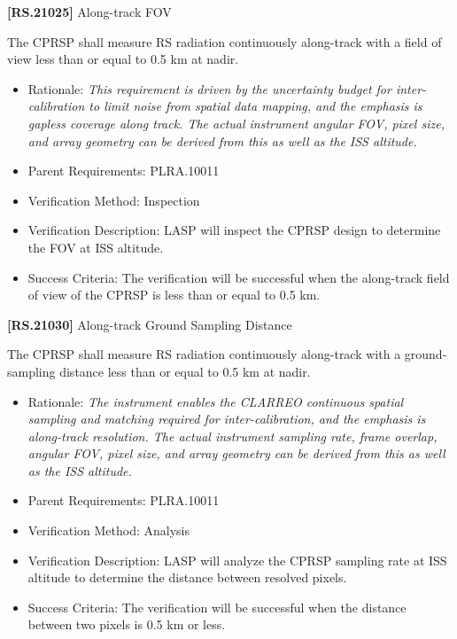 \documentclass[12pt,oneside,oldfontcommands]{memoir}
\begin{document}
\textbf{[RS.21025]} Along-track \gls{FOV}

The \gls{CPRSP} shall \gls{measure} \gls{RS} radiation continuously along-track with a field of view less than or equal to 0.5 km at nadir.

\begin{itemize}
\item{} Rationale: \emph{This requirement is driven by the uncertainty budget for inter-calibration to limit noise from spatial data mapping, and the emphasis is gapless coverage along track. The actual instrument angular FOV, pixel size, and array geometry can be derived from this as well as the ISS altitude.}

\item{} Parent Requirements: PLRA.10011

\item{} Verification Method: Inspection

\item{} Verification Description: \gls{LASP} will inspect the \gls{CPRSP} design to determine the \gls{FOV} at \gls{ISS} altitude.

\item{} Success Criteria: The verification will be successful when the along-track field of view of the \gls{CPRSP} is less than or equal to 0.5 km.

\end{itemize}

\textbf{[RS.21030]} Along-track Ground Sampling Distance

The \gls{CPRSP} shall \gls{measure} \gls{RS} radiation continuously along-track with a ground-sampling distance less than or equal to 0.5 km at nadir.

\begin{itemize}
\item{} Rationale: \emph{The instrument enables the CLARREO continuous spatial sampling and matching required for inter-calibration, and the emphasis is along-track resolution. The actual instrument sampling rate, frame overlap, angular FOV, pixel size, and array geometry can be derived from this as well as the ISS altitude.}

\item{} Parent Requirements: PLRA.10011

\item{} Verification Method: Analysis

\item{} Verification Description: \gls{LASP} will analyze the \gls{CPRSP} sampling rate at \gls{ISS} altitude to determine the distance between resolved pixels.

\item{} Success Criteria: The verification will be successful when the distance between two pixels is 0.5 km or less.

\end{itemize}
\end{document}
